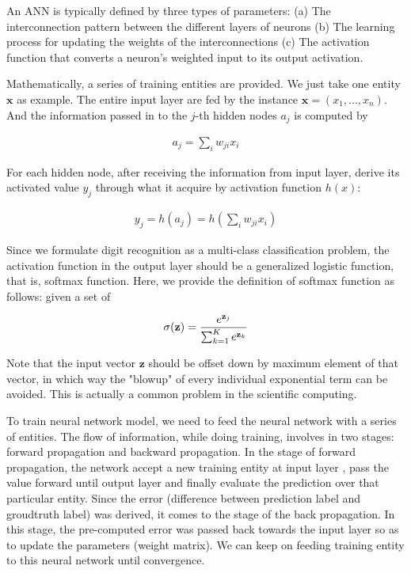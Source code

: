 \documentclass{article} %
\begin{document}
An ANN is typically defined by three types of parameters: (a) The
interconnection pattern between the different layers of neurons (b) The learning
process for updating the weights of the interconnections (c) The activation
function that converts a neuron's weighted input to its output activation.

Mathematically, a series of training entities are provided. We just take one
entity $\mathbf{x}$ as example. The entire input layer are fed by the instance
$\mathbf{x} = (x_1, ..., x_n)$. And the information passed in to the $j$-th
hidden nodes $a_j$ is computed by 

\begin{align}
    a_j = \sum_{i} w_{ji} x_i 
\end{align}

For each hidden node, after receiving the information from input layer,
derive its activated value $y_j$ through what it acquire by activation function $h(x)$:

\begin{align}
   y_j = h(a_j) = h(\sum_{i} w_{ji} x_i)    
\end{align}

Since we formulate digit recognition as a multi-class classification problem,
the activation function in the output layer should be a generalized logistic
function, that is, softmax function. Here, we provide the definition of
softmax function as follows: given a set of 

\begin{align}
    \sigma({\bf z}) = \frac{e^{{\bf z}_j}}{\sum_{k=1}^{K} e^{{\bf z}_k}}
\end{align}

Note that the input vector $\mathbf{z}$ should be offset down by maximum
element of that vector, in which way the "blowup" of every individual
exponential term can be avoided. This is actually a common problem in the
scientific computing.

To train neural network model, we need to feed the neural network with a
series of entities. The flow of information, while doing training,
involves in two stages: forward propagation and backward propagation.  In the
stage of forward propagation, the network accept a new training entity at input layer
, pass the value forward until output layer and finally evaluate the
prediction over that particular entity. Since the error (difference
between prediction label and groudtruth label) was derived, it comes to the
stage of the back propagation. In this stage, the pre-computed error was
passed back towards the input layer so as to update the parameters (weight
matrix). We can keep on feeding training entity to this neural network until
convergence.
\end{document}
